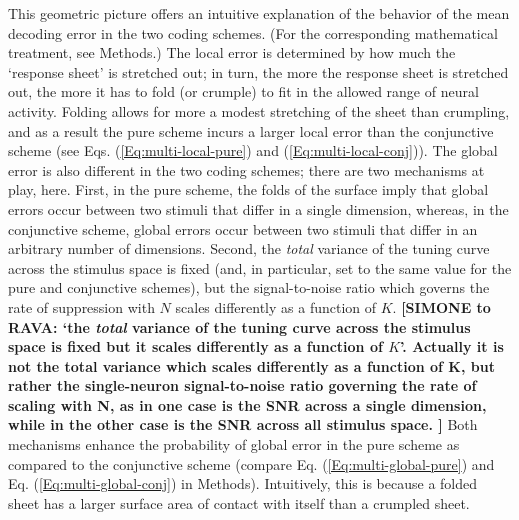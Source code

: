 \documentclass[a4paper]{article}%
\begin{document}
This geometric picture offers an intuitive explanation of the behavior of the
mean decoding error in the two coding schemes. (For the corresponding
mathematical treatment, see Methods.) The local error is determined by how
much the `response sheet' is stretched out; in turn, the more the response
sheet is stretched out, the more it has to fold (or crumple) to fit in the
allowed range of neural activity. Folding allows for more a modest stretching
of the sheet than crumpling, and as a result the pure scheme incurs a larger
local error than the conjunctive scheme (see Eqs. (\ref{Eq:multi-local-pure})
and (\ref{Eq:multi-local-conj})). The global error is also different in the
two coding schemes; there are two mechanisms at play, here. First, in the pure
scheme, the folds of the surface imply that global errors occur between two
stimuli that differ in a single dimension, whereas, in the conjunctive scheme,
global errors occur between two stimuli that differ in an arbitrary number of
dimensions. Second, the \textit{total} variance of the tuning curve across the
stimulus space is fixed (and, in particular, set to the same value for the
pure and conjunctive schemes), but the signal-to-noise ratio which governs the rate of suppression with $N$ scales differently as a function of $K$. \textbf{[SIMONE to RAVA: `the \textit{total} variance of the tuning curve across the
stimulus space is fixed but it scales differently as a function of $K$'. Actually it is not the total variance which scales differently as a function of K, but rather the single-neuron signal-to-noise ratio governing the rate of scaling with N, as in one case is the SNR across a single dimension, while in the other case is the SNR across all stimulus space. ]}
Both mechanisms enhance the probability of global error in the pure scheme as
compared to the conjunctive scheme (compare Eq. (\ref{Eq:multi-global-pure})
and Eq. (\ref{Eq:multi-global-conj}) in Methods). Intuitively, this is because
a folded sheet has a larger surface area of contact with itself than a
crumpled sheet.
\end{document}
